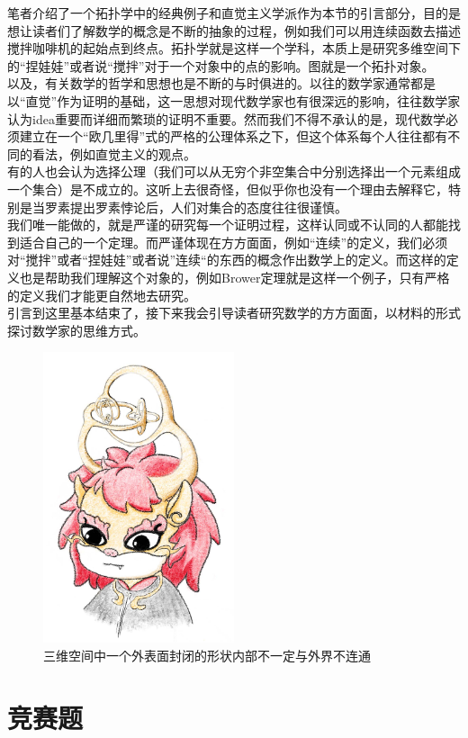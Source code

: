 \documentclass[UTF8,oneside,11pt]{book}
\theoremstyle{plain}\newtheorem{thm}{定理}[chapter]
\theoremstyle{definition}\newtheorem{definition}[thm]{定义}
\theoremstyle{plain}\newtheorem{axiom}[thm]{公理}
\theoremstyle{plain}\newtheorem{coro}[thm]{推论}
\theoremstyle{plain}\newtheorem{lemma}[thm]{引理}
\theoremstyle{plain}\newtheorem{prop}[thm]{性质}
\theoremstyle{plain}\newtheorem{conj}[thm]{猜想}
\theoremstyle{plain}\newtheorem{ques}[thm]{问题}
\theoremstyle{plain}\newtheorem{const}[thm]{构造}
\theoremstyle{remark}\newtheorem{notation}[thm]{注记}
\theoremstyle{plain}\newtheorem*{app}{应用}
\theoremstyle{plain}\newtheorem*{exam}{测试}
\theoremstyle{plain}\newtheorem*{exer}{例子}
\theoremstyle{plain}\newtheorem*{remark}{评论}
\theoremstyle{remark}\newtheorem*{note}{\small{注}}
\numberwithin{equation}{section}
\numberwithin{thm}{chapter}
\begin{document}
笔者介绍了一个拓扑学中的经典例子和直觉主义学派作为本节的引言部分，目的是想让读者们了解数学的概念是不断的抽象的过程，例如我们可以用连续函数去描述搅拌咖啡机的起始点到终点。拓扑学就是这样一个学科，本质上是研究多维空间下的“捏娃娃”或者说“搅拌”对于一个对象中的点的影响。图就是一个拓扑对象。\\以及，有关数学的哲学和思想也是不断的与时俱进的。以往的数学家通常都是以“直觉”作为证明的基础，这一思想对现代数学家也有很深远的影响，往往数学家认为idea重要而详细而繁琐的证明不重要。然而我们不得不承认的是，现代数学必须建立在一个“欧几里得”式的严格的公理体系之下，但这个体系每个人往往都有不同的看法，例如直觉主义的观点。\\
有的人也会认为选择公理（我们可以从无穷个非空集合中分别选择出一个元素组成一个集合）是不成立的。这听上去很奇怪，但似乎你也没有一个理由去解释它，特别是当罗素提出罗素悖论后，人们对集合的态度往往很谨慎。\\
我们唯一能做的，就是严谨的研究每一个证明过程，这样认同或不认同的人都能找到适合自己的一个定理。而严谨体现在方方面面，例如“连续”的定义，我们必须对“搅拌”或者“捏娃娃”或者说”连续“的东西的概念作出数学上的定义。而这样的定义也是帮助我们理解这个对象的，例如Brower定理就是这样一个例子，只有严格的定义我们才能更自然地去研究。\\
引言到这里基本结束了，接下来我会引导读者研究数学的方方面面，以材料的形式探讨数学家的思维方式。
\begin{figure}[htb]
    \centering
    \includegraphics[width=0.5\textwidth]{麒麟.jpg}
    \caption{三维空间中一个外表面封闭的形状内部不一定与外界不连通}
    \label{麒麟图}
\end{figure}
\newpage
\chapter{竞赛题}
\end{document}
